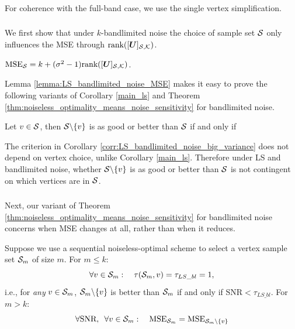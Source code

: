 \subsubsection{}
For coherence with the full-band case, we use the single vertex simplification.
\subsubsection{}
We first show that under $k$-bandlimited noise the choice of sample set $\mathcal{S}$ only influences the MSE through $\textrm{rank}(\matrsubU{S})$.
\begin{lemma}
\label{lemma:LS_bandlimited_noise_MSE}
$        \textrm{MSE}_{\set{S}} = k + (\sigma^2 - 1)\textrm{rank}(\matrsubU{S}) $.
\end{lemma}

\noindent Lemma \ref{lemma:LS_bandlimited_noise_MSE} makes it easy to prove the following variants of Corollary \ref{main_ls} and Theorem \ref{thm:noiseless_optimality_means_noise_sensitivity} for bandlimited noise.

\begin{corollary}
\label{corr:LS_bandlimited_noise_big_variance}
Let $v \in \mathcal{S}$, then $\mathcal{S}\backslash \{v\}$ is as good or better than $\mathcal{S}$ if and only if
\end{corollary}
\noindent The criterion in Corollary \ref{corr:LS_bandlimited_noise_big_variance} does not depend on vertex choice, unlike Corollary \ref{main_ls}. Therefore under LS and bandlimited noise, whether $\mathcal{S} \backslash \{v\}$ is as good or better than $\mathcal{S}$ is not contingent on which vertices are in $\mathcal{S}$.

\subsubsection{}
Next, our variant of Theorem \ref{thm:noiseless_optimality_means_noise_sensitivity} for bandlimited noise concerns when MSE changes at all, rather than when it reduces.
\begin{corollary}
\label{corr:LS_bandlimited_noise_sample_only_k}
    Suppose we use a sequential noiseless-optimal scheme to select a vertex sample set $\mathcal{S}_{m}$ of size $m$. For $m \leq k$: 
\begin{equation}
    \forall v \in \mathcal{S}_{m}: \quad \tau(\mathcal{S}_{m},v) = \tau_{LS\_bl} = 1,
\end{equation}
i.e., for \emph{any} $v \in \mathcal{S}_{m}$, $\mathcal{S}_{m} \backslash \{v\}$ is better than $\mathcal{S}_{m}$ if and only if $\textrm{SNR} < \tau_{LS\_bl}$.
For $m > k$: 
    \begin{equation}
        \forall \text{SNR}, \enskip \forall v \in \mathcal{S}_{m}: \quad \textrm{MSE}_{\mathcal{S}_{m}} = \textrm{MSE}_{\mathcal{S}_{m} \backslash \{ v \}}
    \end{equation}
\end{corollary}

